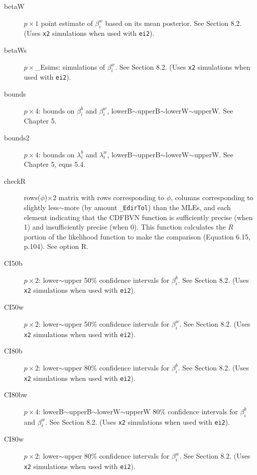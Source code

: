 \documentclass[11pt,titlepage]{article}
\begin{document}
\begin{description}
\item[betaW] $p\times 1$ point estimate of $\beta_i^w$ based on its
  mean posterior.  See Section 8.2.  (Uses \texttt{x2}
  simulations when used with \texttt{ei2}).

\item[betaWs] $p\times$\_Esims: simulations of $\beta_i^w$.  See
  Section 8.2.  (Uses \texttt{x2} simulations when used
  with \texttt{ei2}).

\item[bounds] $p\times 4$: bounds on $\beta_i^b$ and $\beta_i^w$,
  lowerB$\sim$upperB$\sim$lowerW$\sim$upperW.  See Chapter
  5.

\item[bounds2] $p\times 4$: bounds on $\lambda_i^b$ and $\lambda_i^w$,
  lowerB$\sim$upperB$\sim$lowerW$\sim$upperW.  See Chapter
  5, eqns 5.4.

\item[checkR] rows($\phi$)$\times 2$ matrix with rows corresponding to
  $\phi$, columns corresponding to slightly less$\sim$more (by amount
  \texttt{\_EdirTol}) than the MLEs, and each element indicating that
  the CDFBVN function is sufficiently precise (when 1) and
  insufficiently precise (when 0).  This function calculates the $R$
  portion of the likelihood function to make the comparison (Equation
  6.15, p.104).  See option R.

\item[CI50b] $p\times 2$: lower$\sim$upper 50\% confidence intervals
  for $\beta_i^b$.  See Section 8.2.  (Uses \texttt{x2}
  simulations when used with \texttt{ei2}).

\item[CI50w] $p\times 2$: lower$\sim$upper 50\% confidence intervals
  for $\beta_i^w$.  See Section 8.2.  (Uses \texttt{x2}
  simulations when used with \texttt{ei2}).

\item[CI80b] $p\times 2$: lower$\sim$upper 80\% confidence intervals
  for $\beta_i^b$.  See Section 8.2.  (Uses \texttt{x2}
  simulations when used with \texttt{ei2}).

\item[CI80bw] $p\times 4$: lowerB$\sim$upperB$\sim$lowerW$\sim$upperW
  80\% confidence intervals for $\beta_i^b$ and $\beta_i^w$.  See
  Section 8.2.  (Uses \texttt{x2} simulations when used
  with \texttt{ei2}).

\item[CI80w] $p\times 2$: lower$\sim$upper 80\% confidence intervals
  for $\beta_i^w$.  See Section 8.2.  (Uses \texttt{x2}
  simulations when used with \texttt{ei2}).


\end{description}
\end{document}
